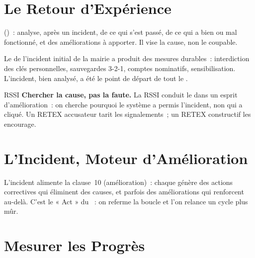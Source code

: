 \section{Le Retour d'Expérience}
\label{sec:c20-retex}

\begin{boxdef}
 ()~: analyse, après un incident, de
ce qui s'est passé, de ce qui a bien ou mal fonctionné, et des améliorations à
apporter. Il vise la cause, non le coupable.
\end{boxdef}

Le  de l'incident initial de la mairie a produit des mesures
durables~: interdiction des clés personnelles, sauvegardes 3-2-1, comptes
nominatifs, sensibilisation. L'incident, bien analysé, a été le point de départ
de tout le .

\begin{boxmetier}{RSSI}
\textbf{Chercher la cause, pas la faute.} La RSSI conduit le  dans
un esprit d'amélioration~: on cherche pourquoi le système a permis l'incident,
non qui a cliqué. Un RETEX accusateur tarit les signalements~; un RETEX
constructif les encourage.
\end{boxmetier}

\section{L'Incident, Moteur d'Amélioration}
\label{sec:c20-amelioration}

L'incident alimente la clause~10 (amélioration)~: chaque  génère
des actions correctives qui éliminent des causes, et parfois des améliorations
qui renforcent au-delà. C'est le « Act » du ~: on referme la boucle
et l'on relance un cycle plus mûr.

\section{Mesurer les Progrès}
\label{sec:c20-progres}

